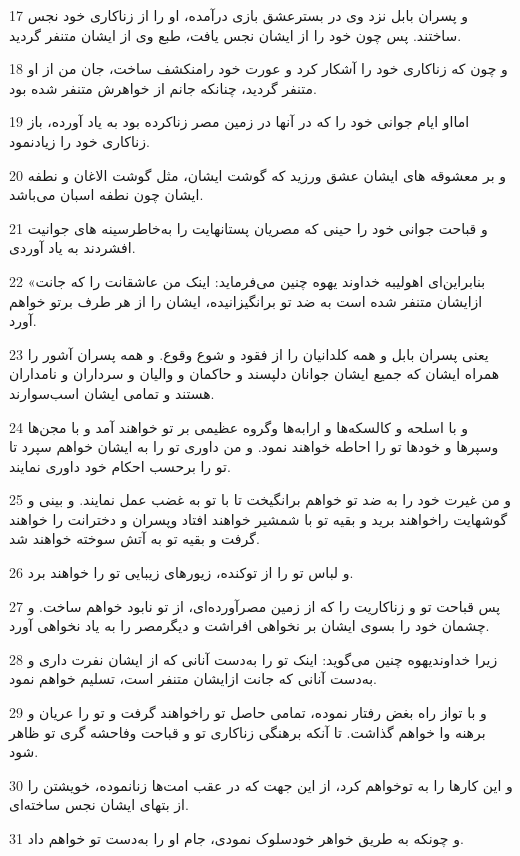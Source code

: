 \par 17 و پسران بابل نزد وی در بسترعشق بازی درآمده، او را از زناکاری خود نجس ساختند. پس چون خود را از ایشان نجس یافت، طبع وی از ایشان متنفر گردید.
\par 18 و چون که زناکاری خود را آشکار کرد و عورت خود رامنکشف ساخت، جان من از او متنفر گردید، چنانکه جانم از خواهرش متنفر شده بود.
\par 19 امااو ایام جوانی خود را که در آنها در زمین مصر زناکرده بود به یاد آورده، باز زناکاری خود را زیادنمود.
\par 20 و بر معشوقه های ایشان عشق ورزید که گوشت ایشان، مثل گوشت الاغان و نطفه ایشان چون نطفه اسبان می‌باشد.
\par 21 و قباحت جوانی خود را حینی که مصریان پستانهایت را به‌خاطرسینه های جوانیت افشردند به یاد آوردی.
\par 22 «بنابراین‌ای اهولیبه خداوند یهوه چنین می‌فرماید: اینک من عاشقانت را که جانت ازایشان متنفر شده است به ضد تو برانگیزانیده، ایشان را از هر طرف برتو خواهم آورد.
\par 23 یعنی پسران بابل و همه کلدانیان را از فقود و شوع وقوع. و همه پسران آشور را همراه ایشان که جمیع ایشان جوانان دلپسند و حاکمان و والیان و سرداران و نامداران هستند و تمامی ایشان اسب‌سوارند.
\par 24 و با اسلحه و کالسکه‌ها و ارابه‌ها وگروه عظیمی بر تو خواهند آمد و با مجن‌ها وسپرها و خودها تو را احاطه خواهند نمود. و من داوری تو را به ایشان خواهم سپرد تا تو را برحسب احکام خود داوری نمایند.
\par 25 و من غیرت خود را به ضد تو خواهم برانگیخت تا با تو به غضب عمل نمایند. و بینی و گوشهایت راخواهند برید و بقیه تو با شمشیر خواهند افتاد وپسران و دخترانت را خواهند گرفت و بقیه تو به آتش سوخته خواهند شد.
\par 26 و لباس تو را از توکنده، زیورهای زیبایی تو را خواهند برد.
\par 27 پس قباحت تو و زناکاریت را که از زمین مصرآورده‌ای، از تو نابود خواهم ساخت. و چشمان خود را بسوی ایشان بر نخواهی افراشت و دیگرمصر را به یاد نخواهی آورد.
\par 28 زیرا خداوندیهوه چنین می‌گوید: اینک تو را به‌دست آنانی که از ایشان نفرت داری و به‌دست آنانی که جانت ازایشان متنفر است، تسلیم خواهم نمود.
\par 29 و با تواز راه بغض رفتار نموده، تمامی حاصل تو راخواهند گرفت و تو را عریان و برهنه وا خواهم گذاشت. تا آنکه برهنگی زناکاری تو و قباحت وفاحشه گری تو ظاهر شود.
\par 30 و این کارها را به توخواهم کرد، از این جهت که در عقب امت‌ها زنانموده، خویشتن را از بتهای ایشان نجس ساخته‌ای.
\par 31 و چونکه به طریق خواهر خودسلوک نمودی، جام او را به‌دست تو خواهم داد.
